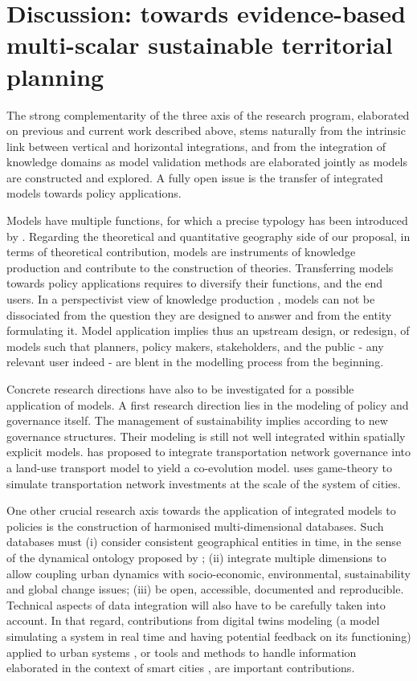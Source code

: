 \section{Discussion: towards evidence-based multi-scalar sustainable territorial planning}


The strong complementarity of the three axis of the research program, elaborated on previous and current work described above, stems naturally from the intrinsic link between vertical and horizontal integrations, and from the integration of knowledge domains as model validation methods are elaborated jointly as models are constructed and explored. A fully open issue is the transfer of integrated models towards policy applications.

Models have multiple functions, for which a precise typology has been introduced by \cite{varenne2018theories}. Regarding the theoretical and quantitative geography \cite{cuyala2014analyse} side of our proposal, in terms of theoretical contribution, models are instruments of knowledge production and contribute to the construction of theories. Transferring models towards policy applications requires to diversify their functions, and the end users. In a perspectivist view of knowledge production \cite{giere2010scientific}, models can not be dissociated from the question they are designed to answer and from the entity formulating it. Model application implies thus an upstream design, or redesign, of models such that planners, policy makers, stakeholders, and the public - any relevant user indeed - are blent in the modelling process from the beginning.


Concrete research directions have also to be investigated for a possible application of models. A first research direction lies in the modeling of policy and governance itself. The management of sustainability implies according to \cite{etzion2018management} new governance structures. Their modeling is still not well integrated within spatially explicit models. \cite{le2015modeling} has proposed to integrate transportation network governance into a land-use transport model to yield a co-evolution model. \cite{raimbault2020coevolution} uses game-theory to simulate transportation network investments at the scale of the system of cities.


One other crucial research axis towards the application of integrated models to policies is the construction of harmonised multi-dimensional databases. Such databases must (i) consider consistent geographical entities in time, in the sense of the dynamical ontology proposed by \cite{bretagnolle2009villes}; (ii) integrate multiple dimensions to allow coupling urban dynamics with socio-economic, environmental, sustainability and global change issues; (iii) be open, accessible, documented and reproducible. Technical aspects of data integration will also have to be carefully taken into account. In that regard, contributions from digital twins modeling (a model simulating a system in real time and having potential feedback on its functioning) applied to urban systems \cite{batty2018digital}, or tools and methods to handle information elaborated in the context of smart cities \cite{shahrour2017smart}, are important contributions.


